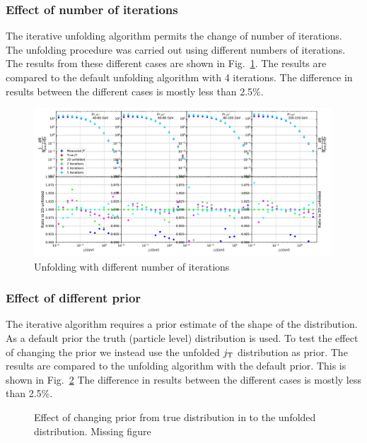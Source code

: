 \subsubsection{Effect of number of iterations}
\label{sec:iterations}
The iterative unfolding algorithm permits the change of number of iterations. The unfolding procedure was carried out using different numbers of iterations. The results from these different cases are shown in Fig.~\ref{fig:iterations}. The results are compared to the default unfolding algorithm with 4 iterations. The difference in results between the different cases is mostly less than 2.5\%.
\begin{figure}
\includegraphics[width=0.99\textwidth]{figures/systematics/IterationsComparison.pdf}
\caption{Unfolding with different number of iterations}
\label{fig:iterations}
\end{figure}

\subsubsection{Effect of different prior}
\label{sec:prior}
The iterative algorithm requires a prior estimate of the shape of the distribution. As a default prior the truth (particle level) distribution is used. To test the effect of changing the prior we instead use the unfolded $j_{\rm T}$ distribution as prior. The results are compared to the unfolding algorithm with the default prior. This is shown in Fig.~\ref{fig:prior} The difference in results between the different cases is mostly less than 2.5\%. 

\begin{figure}
\caption{Effect of changing prior from true distribution in \pythia to the unfolded distribution. {\color{red} Missing figure}}
\label{fig:prior}
\end{figure}

